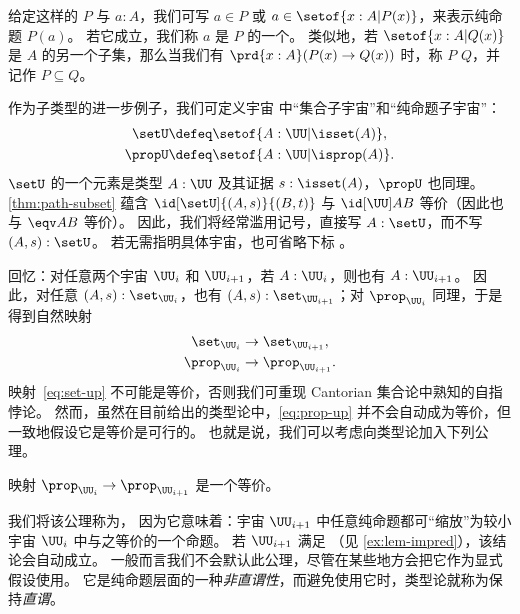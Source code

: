给定这样的 $P$ 与 $a:A$，我们可写 $a\in P$ 或 $a\in \setof{x:A | P(x)}$，来表示纯命题 $P(a)$。
若它成立，我们称 $a$ 是 $P$ 的一个。
类似地，若 $\setof{x:A | Q(x)}$ 是 $A$ 的另一个子集，那么当我们有 $\prd{x:A}(P(x)\rightarrow Q(x))$ 时，称 $P$
%
%
$Q$，并记作 $P\subseteq Q$。

作为子类型的进一步例子，我们可定义宇宙 \UU 中“集合子宇宙”和“纯命题子宇宙”：
\begin{align*}
  \setU &\defeq \setof{A:\UU | \isset(A) },\\
  \propU &\defeq \setof{A:\UU | \isprop(A) }.
\end{align*}
$\setU$ 的一个元素是类型 $A:\UU$ 及其证据 $s:\isset(A)$，$\propU$ 也同理。
\cref{thm:path-subset} 蕴含 $\id[\setU]{(A,s)}{(B,t)}$ 与 $\id[\UU]AB$ 等价（因此也与 $\eqv AB$ 等价）。
因此，我们将经常滥用记号，直接写 $A:\setU$，而不写 $(A,s):\setU$。
若无需指明具体宇宙，也可省略下标 \UU。

回忆：对任意两个宇宙 $\UU_i$ 和 $\UU_{i+1}$，若 $A:\UU_i$，则也有 $A:\UU_{i+1}$。
因此，对任意 $(A,s):\set_{\UU_i}$，也有 $(A,s):\set_{\UU_{i+1}}$；对 $\prop_{\UU_i}$ 同理，于是得到自然映射
\begin{align}
  \set_{\UU_i} &\to \set_{\UU_{i+1}}\label{eq:set-up},\\
  \prop_{\UU_i} &\to \prop_{\UU_{i+1}}.\label{eq:prop-up}
\end{align}
映射~\eqref{eq:set-up} 不可能是等价，否则我们可重现 Cantorian 集合论中熟知的自指悖论。
然而，虽然在目前给出的类型论中，\eqref{eq:prop-up} 并不会自动成为等价，但一致地假设它是等价是可行的。
也就是说，我们可以考虑向类型论加入下列公理。

\begin{axiom}[命题缩放]
  映射 $\prop_{\UU_i} \to \prop_{\UU_{i+1}}$ 是一个等价。
\end{axiom}

我们将该公理称为，
因为它意味着：宇宙 $\UU_{i+1}$ 中任意纯命题都可“缩放”为较小宇宙 $\UU_i$ 中与之等价的一个命题。
若 $\UU_{i+1}$ 满足 \LEM{}（见 \cref{ex:lem-impred}），该结论会自动成立。
一般而言我们不会默认此公理，尽管在某些地方会把它作为显式假设使用。
它是纯命题层面的一种\emph{非直谓性}，而避免使用它时，类型论就称为保持\emph{直谓}。
%
%

